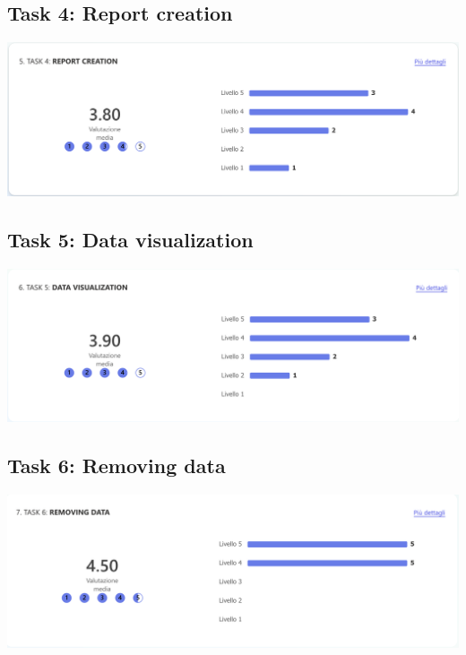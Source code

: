 \documentclass{article}
\begin{document}
\subsection{Task 4: Report creation}
\begin{center}
  \includegraphics[width=\linewidth]{result_images/report_creation_result.png}
\end{center}

\subsection{Task 5: Data visualization}
\begin{center}
  \includegraphics[width=\linewidth]{result_images/data_visualization_result.png}
\end{center}

\subsection{Task 6: Removing data}
\begin{center}
  \includegraphics[width=\linewidth]{result_images/remove_habit_result.png}
\end{center}
\end{document}
